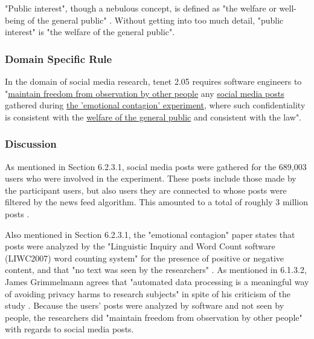 "Public interest", though a nebulous concept, is defined as "the welfare or well-being of the general public" \cite{define-public-interest}.  Without getting into too much detail, "public interest" is "the welfare of the general public".

\subsubsection{Domain Specific Rule}
In the domain of social media research, tenet 2.05 requires software engineers to "\uline{maintain freedom from observation by other people} any \uline{social media posts} gathered during \uline{the 'emotional contagion' experiment}, where such confidentiality is consistent with the \uline{welfare of the general public} and consistent with the law".

\subsubsection{Discussion}
As mentioned in Section 6.2.3.1, social media posts were gathered for the 689,003 users who were involved in the experiment.  These posts include those made by the participant users, but also users they are connected to whose posts were filtered by the news feed algorithm.  This amounted to a total of roughly 3 million posts \cite{study}.

Also mentioned in Section 6.2.3.1, the "emotional contagion" paper states that posts were analyzed by the "Linguistic Inquiry and Word Count software (LIWC2007) word counting system" for the presence of positive or negative content, and that "no text was seen by the researchers" \cite{study}.  As mentioned in 6.1.3.2, James Grimmelmann agrees that "automated data processing is a meaningful way of avoiding privacy harms to research subjects" in spite of his criticism of the study \cite{laboratorium}.  Because the users' posts were analyzed by software and not seen by people, the researchers did "maintain freedom from observation by other people" with regards to social media posts.

